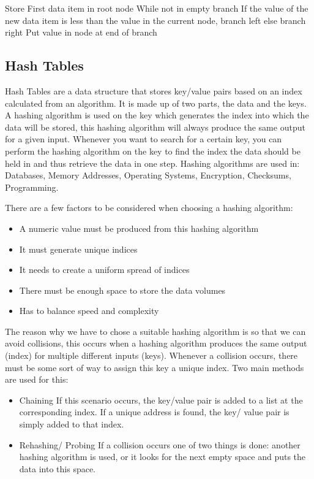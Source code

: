   Store First data item in root node
  While not in empty branch
	  If the value of the new data item is less than the value in the current node, branch left
	  else branch right
  Put value in node at end of branch
  
\subsection{Hash Tables}
  
  Hash Tables are a data structure that stores key/value pairs based on an index calculated from an algorithm. It is made up of two parts, the data and the keys. A hashing algorithm is used on the key which generates the index into which the data will be stored, this hashing algorithm will always produce the same output for a given input. Whenever you want to search for a certain key, you can perform the hashing algorithm on the key to find the index the data should be held in and thus retrieve the data in one step. Hashing algorithms are used in: Databases, Memory Addresses, Operating Systems, Encryption, Checksums, Programming.
  
  There are a few factors to be considered when choosing a hashing algorithm:
  \begin{itemize}
  	\item A numeric value must be produced from this hashing algorithm
  	\item It must generate unique indices
  	\item It needs to create a uniform spread of indices
  	\item There must be enough space to store the data volumes
  	\item Has to balance speed and complexity
  \end{itemize}
  
  The reason why we have to chose a suitable hashing algorithm is so that we can avoid collisions, this occurs when a hashing algorithm produces the same output (index) for multiple different inputs (keys). Whenever a collision occurs, there must be some sort of way to assign this key a unique index. Two main methods are used for this:
  \begin{itemize}
  	\item Chaining
	  	\subitem If this scenario occurs, the key/value pair is added to a list at the corresponding index. If a unique address is found, the key/ value pair is simply added to that index.
  	\item Rehashing/ Probing
	  	\subitem If a collision occurs one of two things is done: another hashing algorithm is used, or it looks for the next empty space and puts the data into this space.
  \end{itemize}

